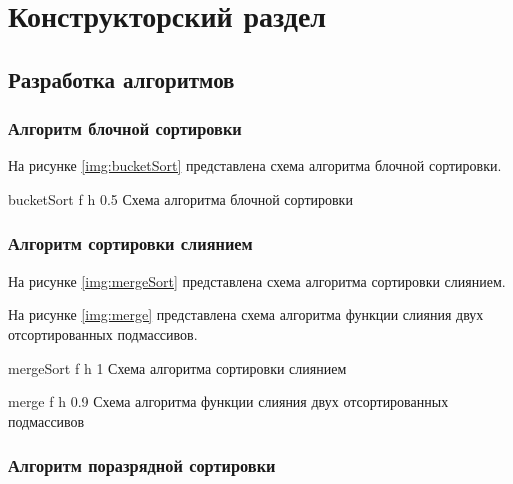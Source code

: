\chapter{Конструкторский раздел}

\section{Разработка алгоритмов}

\subsection{Алгоритм блочной сортировки}

На рисунке \ref{img:bucketSort} представлена схема алгоритма блочной сортировки.

{bucketSort} %
{f} %
{h} %
{0.5\textwidth} %
{Схема алгоритма блочной сортировки} %

\clearpage

\subsection{Алгоритм сортировки слиянием}

На рисунке \ref{img:mergeSort} представлена схема алгоритма сортировки слиянием.

На рисунке \ref{img:merge} представлена схема алгоритма функции слияния двух отсортированных подмассивов.

{mergeSort} %
{f} %
{h} %
{1\textwidth} %
{Схема алгоритма сортировки слиянием} %

{merge} %
{f} %
{h} %
{0.9\textwidth} %
{Схема алгоритма функции слияния двух отсортированных подмассивов} %

\clearpage

\subsection{Алгоритм поразрядной сортировки}

